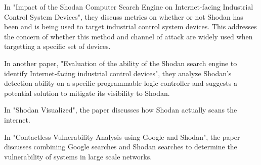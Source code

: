 



In "Impact of the Shodan Computer Search Engine on Internet-facing Industrial
Control System Devices"\cite{afit//CSAR-10-025-01}, they discuss metrics
on whether or not Shodan has been and is being used to target industrial control
system devices. This addresses the concern of whether this method and channel of
attack are widely used when targetting a specific set of devices.

In another paper, "Evaluation of the ability of the Shodan search engine to
identify Internet-facing industrial control devices"\cite{bodenheim_shodan_ics},
they analyze Shodan's detection ability on a specific programmable logic controller
and suggests a potential solution to mitigate its visibility to Shodan.

In "Shodan Visualized"\cite{shodan_vis}, the paper discusses how Shodan actually
scans the internet.

In "Contactless Vulnerability Analysis using Google and Shodan"\cite{google_shodan},
the paper discusses combining Google searches and Shodan searches to determine
the vulnerability of systems in large scale networks.
